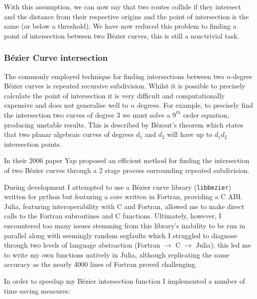 With this assumption, we can now say that two routes collide if they intersect and the distance from their respective origins and the point of intersection is the same (or below a threshold). We have now reduced this problem to finding a point of intersection between two Bézier curves, this is still a non-trivial task.

\subsubsection{Bézier Curve intersection}
\label{subsec:approach:bezInt}

The commonly employed technique for finding intersections between two $n$-degree Bézier curves is repeated recursive subdivision. Whilst it is possible to precisely calculate the point of intersection it is very difficult and computationally expensive and does not generalise well to $n$ degrees. For example, to precisely find the intersection two curves of degree 3 we must solve a $9^{th}$ order equation, producing unstable results. This is described by Bézout's theorem which states that two planar algebraic curves of degrees $d_{1}$ and $d_{2}$ will have up to $d_{1}d_{2}$ intersection points.

In their 2006 paper Yap\cite{yapCompleteSubdivisionAlgorithms2006} proposed an efficient method for finding the intersection of two Bézier curves through a 2 stage process surrounding repeated subdivision.

During development I attempted to use a Bézier curve library (\texttt{libbezier})\cite{Hermes2017} written for python but featuring a core written in Fortran, providing a C ABI. Julia, featuring interoperability with C and Fortran, allowed me to make direct calls to the Fortran subroutines and C functions. Ultimately, however, I encountered too many issues stemming from this library's inability to be run in parallel along with seemingly random segfaults which I struggled to diagnose through two levels of language abstraction (Fortran $\rightarrow$ C $\rightarrow$ Julia); this led me to write my own functions natively in Julia, although replicating the same accuracy as the nearly 4000 lines of Fortran proved challenging.

In order to speedup my Bézier intersection function I implemented a number of time saving measures:

